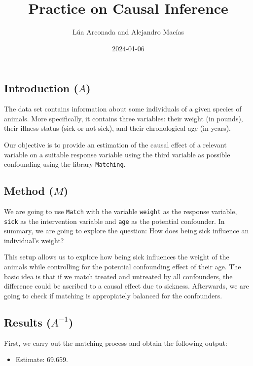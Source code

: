 \documentclass[
]{article}
\title{Practice on Causal Inference}
\author{Lúa Arconada and Alejandro Macías}
\date{2024-01-06}
\providecommand{\tightlist}{%
  \setlength{\itemsep}{0pt}\setlength{\parskip}{0pt}}
\begin{document}
\maketitle

\hypertarget{introduction-a}{%
\subsection{\texorpdfstring{Introduction
(\(A\))}{Introduction (A)}}\label{introduction-a}}

The data set contains information about some individuals of a given
species of animals. More specifically, it contains three variables:
their weight (in pounds), their illness status (sick or not sick), and
their chronological age (in years).

Our objective is to provide an estimation of the causal effect of a
relevant variable on a suitable response variable using the third
variable as possible confounding using the library \texttt{Matching}.

\hypertarget{method-m}{%
\subsection{\texorpdfstring{Method
(\(M\))}{Method (M)}}\label{method-m}}

We are going to use \texttt{Match} with the variable \texttt{weight} as
the response variable, \texttt{sick} as the intervention variable and
\texttt{age} as the potential confounder. In summary, we are going to
explore the question: How does being sick influence an individual's
weight?

This setup allows us to explore how being sick influences the weight of
the animals while controlling for the potential confounding effect of
their age. The basic idea is that if we match treated and untreated by
all confounders, the difference could be ascribed to a causal effect due
to sickness. Afterwards, we are going to check if matching is
appropiately balanced for the confounders.

\hypertarget{results-a-1}{%
\subsection{\texorpdfstring{Results
(\(A^{-1}\))}{Results (A\^{}\{-1\})}}\label{results-a-1}}

First, we carry out the matching process and obtain the following
output:

\begin{itemize}
\tightlist
\item
  Estimate: 69.659.
\end{itemize}
\end{document}
